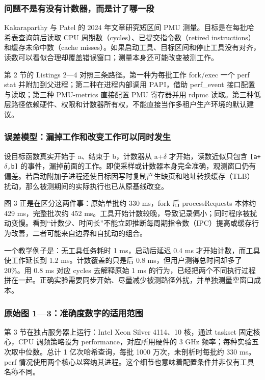\documentclass[UTF8,fontset=fandol,openany,11pt]{ctexbook}
\begin{document}
\subsubsection{问题不是有没有计数器，而是计了哪一段}
Kakaraparthy 与 Patel 的 2024 年文章研究短区间 PMU 测量。目标是在每批哈希表查询前后读取 CPU 周期数（cycles）、已提交指令数（retired instructions）和缓存未命中数（cache misses）。如果启动工具、目标区间和停止工具没有对齐，读数可以看似合理却覆盖错误窗口；测量本身还可能改变被测工作。\cite{paper-hardware}

第 2 节的 Listings 2—4 对照三条路径。第一种为每批工作 fork/exec 一个 perf stat 并附加到父进程；第二种在进程内部调用 PAPI，借助 perf\_event 接口配置与读取；第三种 PMU-metrics 直接配置 PMU 寄存器并用 rdpmc 读取。第三种低层路径依赖硬件、权限和计数器所有权，不能直接当作多租户生产环境的默认建议。

\subsubsection{误差模型：漏掉工作和改变工作可以同时发生}
设目标函数真实开始于 a、结束于 b，计数器从 a+\ensuremath{\delta} 才开始，读数近似只包含 \texttt{[a+\ensuremath{\delta},b]} 的事件，漏掉前面的工作。即使采样或计数器本身完全准确，观测窗口仍有偏差。若启动附加子进程还使目标因写时复制产生缺页和地址转换缓存（TLB）扰动，那么被测期间的实际执行也已从原基线改变。

图 3 正是在区分这两件事：原始单批约 330 ms，fork 后 processRequests 本体约 429 ms，完整批次约 452 ms。工具开始计数较晚，导致记录偏小；同时程序被扰动变慢。看到“计数少、时间长”不能立即推断每周期指令数（IPC）提高或缓存行为改善，二者可能来自边界和自扰动的组合。

一个教学例子是：无工具任务耗时 1 ms，启动后延迟 0.4 ms 才开始计数，而工具使工作延长到 1.2 ms。计数覆盖的只是后 0.8 ms，但用户测得总时间却多了 20\%。用 0.8 ms 对应 cycles 去解释原始 1 ms 的行为，已经把两个不同执行过程拼在一起。正确实验需要同步开始、尽量减少被测路径外扰，并单独测量空窗口成本。

\subsubsection{原始图 1—3：准确度数字的适用范围}
第 3 节在独占服务器上运行：Intel Xeon Silver 4114、10 核，通过 taskset 固定核心，CPU 调频策略设为 performance，对应所用硬件的 3 GHz 频率；每种实验五次取中位数。总计 1 亿次哈希查询，每批 1000 万次，未剖析时每批约 330 ms。perf 情况使用两个核心以容纳其进程。这个细节也意味着配置条件并非仅有工具名称不同。
\end{document}
